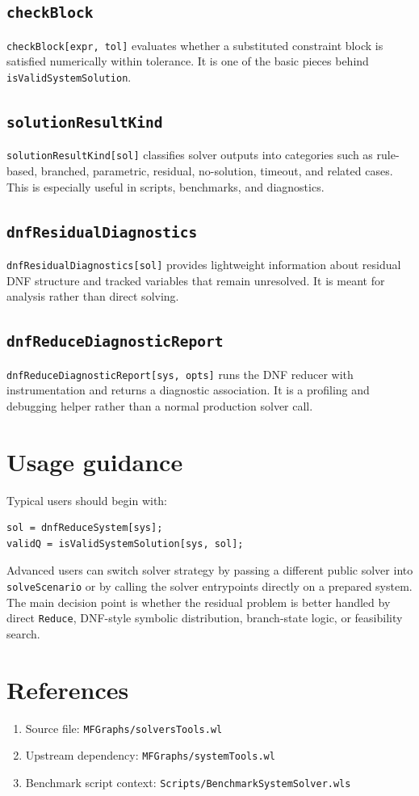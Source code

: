 \documentclass[11pt]{article}
\begin{document}
\subsection*{\texttt{checkBlock}}

\texttt{checkBlock[expr, tol]} evaluates whether a substituted constraint block is satisfied numerically within tolerance. It is one of the basic pieces behind \texttt{isValidSystemSolution}.

\subsection*{\texttt{solutionResultKind}}

\texttt{solutionResultKind[sol]} classifies solver outputs into categories such as rule-based, branched, parametric, residual, no-solution, timeout, and related cases. This is especially useful in scripts, benchmarks, and diagnostics.

\subsection*{\texttt{dnfResidualDiagnostics}}

\texttt{dnfResidualDiagnostics[sol]} provides lightweight information about residual DNF structure and tracked variables that remain unresolved. It is meant for analysis rather than direct solving.

\subsection*{\texttt{dnfReduceDiagnosticReport}}

\texttt{dnfReduceDiagnosticReport[sys, opts]} runs the DNF reducer with instrumentation and returns a diagnostic association. It is a profiling and debugging helper rather than a normal production solver call.

\section{Usage guidance}

Typical users should begin with:

\begin{verbatim}
sol = dnfReduceSystem[sys];
validQ = isValidSystemSolution[sys, sol];
\end{verbatim}

Advanced users can switch solver strategy by passing a different public solver into \texttt{solveScenario} or by calling the solver entrypoints directly on a prepared system. The main decision point is whether the residual problem is better handled by direct \texttt{Reduce}, DNF-style symbolic distribution, branch-state logic, or feasibility search.

\section*{References}

\begin{enumerate}
\item Source file: \texttt{MFGraphs/solversTools.wl}
\item Upstream dependency: \texttt{MFGraphs/systemTools.wl}
\item Benchmark script context: \texttt{Scripts/BenchmarkSystemSolver.wls}
\end{enumerate}
\end{document}

